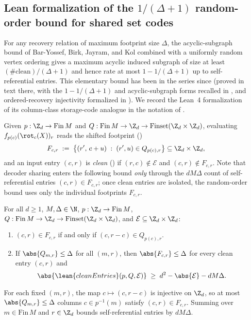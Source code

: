 \subsection{Lean formalization of the \texorpdfstring{$1/(\Delta + 1)$}{1/(Delta + 1)} random-order bound for shared set codes}\label{sec:set-capacity}

For any recovery relation of maximum footprint size $\Delta$, the acyclic-subgraph bound of
Bar-Yossef, Birk, Jayram, and Kol \cite[Theorem~3]{BBJK2011} combined with a uniformly random vertex
ordering gives a maximum acyclic induced subgraph of size at least $(\text{\#clean})/(\Delta + 1)$
and hence rate at most $1 - 1/(\Delta + 1)$ up to self-referential entries. This elementary bound has
been in the series since \cite[Proposition~4.14(a)--(b)]{FourthPaper2026} (proved in text there, with
the $1 - 1/(\Delta+1)$ and acyclic-subgraph forms recalled in
\cite[Sections~4.1 and~6.7]{SeventeenthPaper2026}, and ordered-recovery injectivity formalized in
). We record the Lean~4 formalization of its
column-class storage-code analogue in the notation of .

Given $p : \Z_d \to \mathrm{Fin}\,M$ and $Q : \mathrm{Fin}\,M \to \Z_d \to \mathrm{Finset}(\Z_d \times \Z_d)$,
evaluating $f_{p(c)}(\rot_c(X))_r$ reads the shifted footprint ()
\[
  F_{c,r} \;:=\; \bigl\{(r',\, c + u) \;:\; (r', u) \in Q_{p(c), r}\bigr\} \subseteq \Z_d \times \Z_d,
\]
and an input entry $(c, r)$ is \emph{clean} () if $(r, c) \notin \mathcal{E}$ and
$(c, r) \notin F_{c,r}$. Note that decoder sharing enters the following bound \emph{only} through the
$d M \Delta$ count of self-referential entries $(c, r) \in F_{c,r}$; once clean entries are isolated,
the random-order bound uses only the individual footprints $F_{c,r}$.

\begin{lemma}\label{lem:clean-count}
For all $d \ge 1$, $M, \Delta \in \N$, $p : \Z_d \to \mathrm{Fin}\,M$,
$Q : \mathrm{Fin}\,M \to \Z_d \to \mathrm{Finset}(\Z_d \times \Z_d)$, and
$\mathcal{E} \subseteq \Z_d \times \Z_d$:
\begin{enumerate}[label=(\alph*)]
\item $(c, r) \in F_{c,r}$ if and only if $(c, r - c) \in Q_{p(c), r}$.
\item If $\abs{Q_{m,r}} \le \Delta$ for all $(m, r)$, then $\abs{F_{c,r}} \le \Delta$ for every clean
  entry $(c, r)$ and
  \[
    \abs{\lean{cleanEntries}(p, Q, \mathcal{E})} \;\ge\; d^2 - \abs{\mathcal{E}} - d M \Delta.
  \]
\end{enumerate}
\end{lemma}
\begin{outline}
For each fixed $(m, r)$, the map $c \mapsto (c, r - c)$ is injective on $\Z_d$, so at most
$\abs{Q_{m,r}} \le \Delta$ columns $c \in p^{-1}(m)$ satisfy $(c, r) \in F_{c,r}$. Summing over
$m \in \mathrm{Fin}\,M$ and $r \in \Z_d$ bounds self-referential entries by $d M \Delta$.
\end{outline}

